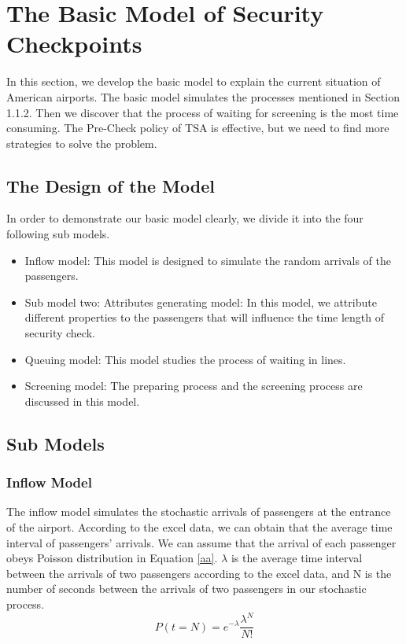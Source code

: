 \documentclass{mcmthesis}
\begin{document}
\section{The Basic Model of Security Checkpoints}
\par In this section, we develop the basic model to explain the current situation of American airports. The basic model simulates the processes mentioned in Section 1.1.2. Then
we discover that the process of waiting for screening is the most time consuming. The
Pre-Check policy of TSA is effective, but we need to find more strategies to solve the
problem.
\subsection{The Design of the Model}
\par In order to demonstrate our basic model clearly, we divide it into the four following
sub models.
\begin{itemize}
\item Inflow model: This model is designed to simulate the random arrivals of the passengers.
\item Sub model two: Attributes generating model: In this model, we attribute different
properties to the passengers that will influence the time length of security check.
\item Queuing model: This model studies the process of waiting in lines.
\item Screening model: The preparing process and the screening process are discussed
in this model.
\end{itemize}
\subsection{Sub Models}
\subsubsection{Inflow Model}
\par The inflow model simulates the stochastic arrivals of passengers at the entrance of
the airport. According to the excel data, we can obtain that the average time interval of
passengers' arrivals. We can assume that the arrival of each passenger obeys Poisson
distribution in Equation \eqref{aa}. $ \lambda $ is the average time interval between the arrivals of two
passengers according to the excel data, and N is the number of seconds between the
arrivals of two passengers in our stochastic process.
\begin{equation}
P(t = N) = {e^{ - \lambda }}\frac{{{\lambda ^N}}}{{N!}} \label{aa}
\end{equation}
\end{document}
